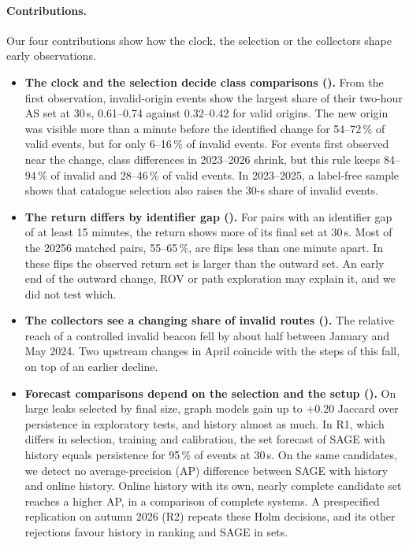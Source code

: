 \paragraph{Contributions.}
Our four contributions show how the clock, the selection or the collectors shape early observations.
\begin{itemize}
\item \textbf{The clock and the selection decide class comparisons ().} From the first observation, invalid-origin events show the largest share of their two-hour AS set at 30\,s, 0.61--0.74 against 0.32--0.42 for valid origins.
The new origin was visible more than a minute before the identified change for 54--72\,\% of valid events, but for only 6--16\,\% of invalid events.
For events first observed near the change, class differences in 2023--2026 shrink, but this rule keeps 84--94\,\% of invalid and 28--46\,\% of valid events.
In 2023--2025, a label-free sample shows that catalogue selection also raises the 30-s share of invalid events.
\item \textbf{The return differs by identifier gap ().} For pairs with an identifier gap of at least 15 minutes, the return shows more of its final set at 30\,s.
Most of the \num{20256} matched pairs, 55--65\,\%, are flips less than one minute apart.
In these flips the observed return set is larger than the outward set.
An early end of the outward change, ROV or path exploration may explain it, and we did not test which.
\item \textbf{The collectors see a changing share of invalid routes ().} The relative reach of a controlled invalid beacon fell by about half between January and May 2024.
Two upstream changes in April coincide with the steps of this fall, on top of an earlier decline.
\item \textbf{Forecast comparisons depend on the selection and the setup ().} On large leaks selected by final size, graph models gain up to $+0.20$ Jaccard over persistence in exploratory tests, and history almost as much.
In R1, which differs in selection, training and calibration, the set forecast of SAGE with history equals persistence for 95\,\% of events at 30\,s.
On the same candidates, we detect no average-precision (AP) difference between SAGE with history and online history.
Online history with its own, nearly complete candidate set reaches a higher AP, in a comparison of complete systems.
A prespecified replication on autumn 2026 (R2) repeats these Holm decisions, and its other rejections favour history in ranking and SAGE in sets.
\end{itemize}

